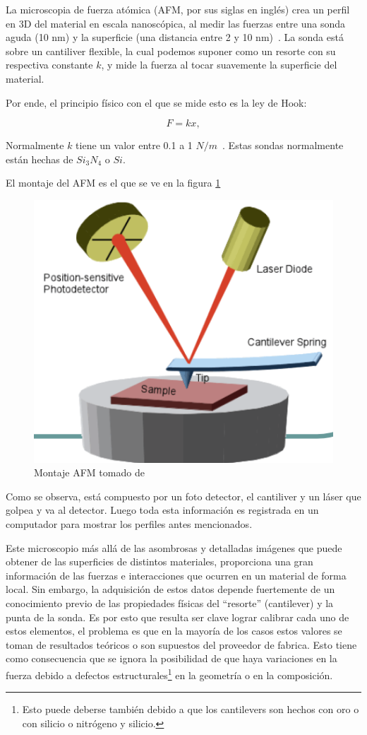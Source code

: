\documentclass{article}
\begin{document}
La microscopia de fuerza atómica (AFM, por sus siglas en inglés) crea un perfil en 3D del material en escala nanoscópica, al medir las fuerzas entre una sonda aguda (10 nm) y la superficie (una distancia entre 2 y 10 nm)~\cite{AFM}. La sonda está sobre un cantiliver flexible, la cual podemos suponer como un resorte con su respectiva constante $k$, y mide la fuerza al tocar suavemente la superficie del material.

Por ende, el principio físico con el que se mide esto es la ley de Hook:

\[F=kx,\]

Normalmente $k$ tiene un valor entre 0.1 a 1 $N/m$~\cite{AFM}. Estas sondas normalmente están hechas de $Si_3N_4$ o $Si$. 

El montaje del AFM es el que se ve en la figura \ref{AFM}

\begin{figure}
    \centering
    \includegraphics[scale=0.6]{Proyecto_final/Propuesta/AFM.png}
    \caption{Montaje AFM tomado de \cite{ClaseAFM}}
    \label{AFM}
\end{figure}

Como se observa, está compuesto por un foto detector, el cantiliver y un láser que golpea y va al detector. Luego toda esta información es registrada en un computador para mostrar los perfiles antes mencionados.

 Este microscopio más allá de las asombrosas y detalladas imágenes que puede obtener de las superficies de distintos materiales, proporciona una gran información de las fuerzas e interacciones que ocurren en un material de forma local. Sin embargo, la adquisición de estos datos depende fuertemente de un conocimiento previo de las propiedades físicas del ``resorte'' (cantilever) y la punta de la sonda. Es por esto que resulta ser clave lograr calibrar cada uno de estos elementos, el problema es que en la mayoría de los casos estos valores se toman de resultados teóricos o son supuestos del proveedor de fabrica. Esto tiene como consecuencia que se ignora la posibilidad de que haya variaciones en la fuerza debido a defectos estructurales\footnote{Esto puede deberse también debido a que los cantilevers son hechos con oro o con silicio o nitrógeno y silicio.} en la geometría o en la composición.
 
\end{document}
